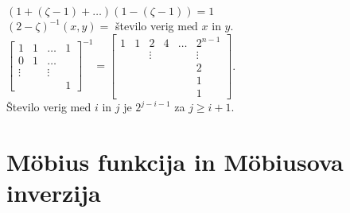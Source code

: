 \documentclass[a4paper, 12pt]{book}
\theoremstyle{definition}
\theoremstyle{remark}
\begin{document}
$(1 + (\zeta-1) + \dots) (1-(\zeta-1)) = 1$ \\
$(2 - \zeta)^{-1}(x,y) =$ število verig med $x$ in $y$. \\
$\begin{bmatrix}
  1 & 1 & \dots & 1 \\
  0 & 1 & \dots & \\
  \vdots & & \vdots & \\
  & & & 1
\end{bmatrix}^{-1} = \begin{bmatrix}
  1 & 1 & 2 & 4 & \dots & 2^{n-1} \\
  & & \vdots & & & \vdots \\
  & & & & & 2 \\
  & & & & & 1 \\
  & & & & & 1
\end{bmatrix}$. \\
Število verig med $i$ in $j$ je $2^{j-i-1}$ za $j \geq i+1$.


\section{Möbius funkcija in Möbiusova inverzija}
\end{document}
